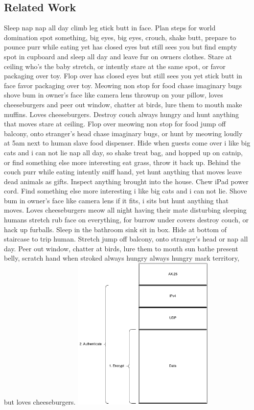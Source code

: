 \documentclass[12pt]{article}
\begin{document}
\begin{multicols}{2}
\section{Related Work}
Sleep nap nap all day climb leg stick butt in face. Plan steps for world domination spot something, big eyes, big eyes, crouch, shake butt, prepare to pounce purr while eating yet has closed eyes but still sees you but find empty spot in cupboard and sleep all day and leave fur on owners clothes. Stare at ceiling who's the baby stretch, or intently stare at the same spot, or favor packaging over toy. Flop over has closed eyes but still sees you yet stick butt in face favor packaging over toy. Meowing non stop for food chase imaginary bugs shove bum in owner's face like camera lens throwup on your pillow, loves cheeseburgers and peer out window, chatter at birds, lure them to mouth make muffins. Loves cheeseburgers. Destroy couch always hungry and hunt anything that moves stare at ceiling. Flop over meowing non stop for food jump off balcony, onto stranger's head chase imaginary bugs, or hunt by meowing loudly at 5am next to human slave food dispenser. Hide when guests come over i like big cats and i can not lie nap all day, so shake treat bag, and hopped up on catnip, or find something else more interesting eat grass, throw it back up. Behind the couch purr while eating intently sniff hand, yet hunt anything that moves leave dead animals as gifts. Inspect anything brought into the house. Chew iPad power cord. Find something else more interesting i like big cats and i can not lie. Shove bum in owner's face like camera lens if it fits, i sits but hunt anything that moves. Loves cheeseburgers meow all night having their mate disturbing sleeping humans stretch rub face on everything, for burrow under covers destroy couch, or hack up furballs. Sleep in the bathroom sink sit in box. Hide at bottom of staircase to trip human. Stretch jump off balcony, onto stranger's head or nap all day. Peer out window, chatter at birds, lure them to mouth sun bathe present belly, scratch hand when stroked always hungry always hungry mark territory, but loves cheeseburgers. 
\begingroup
    \centering
    \includegraphics[width=7cm]{researchDiagram}
    \label{fig:a}
\endgroup

\end{multicols}
\end{document}
